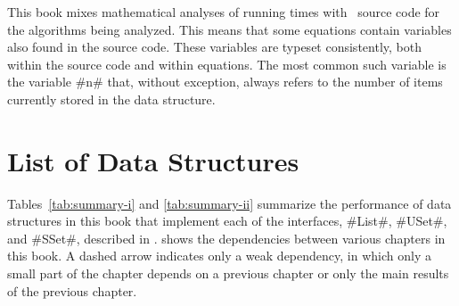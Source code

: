 {{{{{{{{{{This book mixes mathematical analyses of running times with \lang\ source code for the algorithms being analyzed.  This means that some equations contain variables also found in the source code.  These variables are typeset consistently, both within the source code and within equations.  The most common such variable is the variable #n#  that, without exception, always refers to the number of items currently stored in the data structure. 
}

\section{List of Data Structures}

Tables~\ref{tab:summary-i} and \ref{tab:summary-ii} summarize the performance of data structures in this book that implement each of the interfaces, #List#, #USet#, and #SSet#, described in .   shows the dependencies between various chapters in this book.   A dashed arrow indicates only a weak dependency, in which only a small part of the chapter depends on a previous chapter or only the main results of the previous chapter.

}}}}}}}}}
